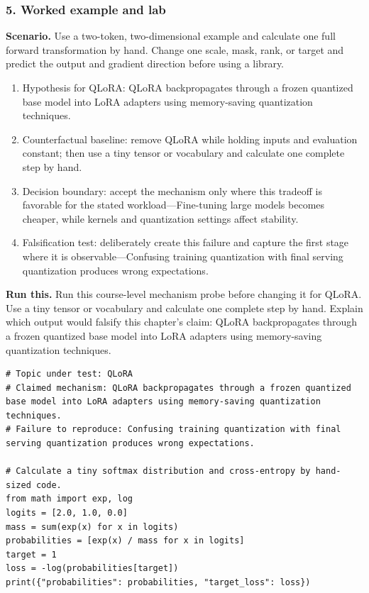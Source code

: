 \subsubsection*{5. Worked example and lab}
\textbf{Scenario.} Use a two-token, two-dimensional example and calculate one full forward transformation by hand. Change one scale, mask, rank, or target and predict the output and gradient direction before using a library.
\begin{enumerate}
\item Hypothesis for QLoRA: QLoRA backpropagates through a frozen quantized base model into LoRA adapters using memory-saving quantization techniques.
\item Counterfactual baseline: remove QLoRA while holding inputs and evaluation constant; then use a tiny tensor or vocabulary and calculate one complete step by hand.
\item Decision boundary: accept the mechanism only where this tradeoff is favorable for the stated workload—Fine-tuning large models becomes cheaper, while kernels and quantization settings affect stability.
\item Falsification test: deliberately create this failure and capture the first stage where it is observable—Confusing training quantization with final serving quantization produces wrong expectations.
\end{enumerate}
\textbf{Run this.} Run this course-level mechanism probe before changing it for QLoRA. Use a tiny tensor or vocabulary and calculate one complete step by hand. Explain which output would falsify this chapter's claim: QLoRA backpropagates through a frozen quantized base model into LoRA adapters using memory-saving quantization techniques.
\begin{Verbatim}[fontsize=\scriptsize]
# Topic under test: QLoRA
# Claimed mechanism: QLoRA backpropagates through a frozen quantized base model into LoRA adapters using memory-saving quantization techniques.
# Failure to reproduce: Confusing training quantization with final serving quantization produces wrong expectations.

# Calculate a tiny softmax distribution and cross-entropy by hand-sized code.
from math import exp, log
logits = [2.0, 1.0, 0.0]
mass = sum(exp(x) for x in logits)
probabilities = [exp(x) / mass for x in logits]
target = 1
loss = -log(probabilities[target])
print({"probabilities": probabilities, "target_loss": loss})
\end{Verbatim}

